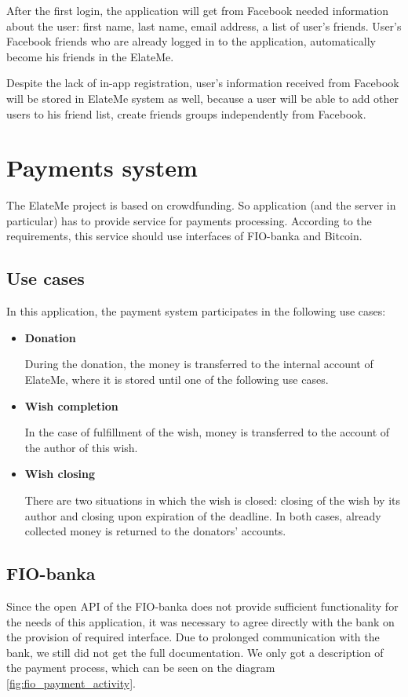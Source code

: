 After the first login, the application will get from Facebook needed information about the user: first name, last name, email address, a list of user's friends. User's Facebook friends who are already logged in to the application, automatically become his friends in the ElateMe.

Despite the lack of in-app registration, user's information received from Facebook will be stored in ElateMe system as well, because a user will be able to add other users to his friend list, create friends groups independently from Facebook.



\newcommand{\uitem}[1]{
\item \textbf{#1} \par
}
\newcommand{\aitem}[1]{
\item \textbf{#1} \par
}
\section{Payments system}
The ElateMe project is based on crowdfunding. So application (and the server in particular) has to provide service for payments processing. According to the requirements, this service should use interfaces of FIO-banka and Bitcoin.

\subsection{Use cases}
In this application, the payment system participates in the following use cases:

\begin{itemize}
\uitem{Donation}
During the donation, the money is transferred to the internal account of ElateMe, where it is stored until one of the following use cases.

\uitem{Wish completion}
In the case of fulfillment of the wish, money is transferred to the account of the author of this wish.

\uitem{Wish closing}
There are two situations in which the wish is closed: closing of the wish by its author and closing upon expiration of the deadline. In both cases, already collected money is returned to the donators' accounts.
\end{itemize}

\subsection{FIO-banka}
Since the open \ac{API} of the FIO-banka \cite{fio} does not provide sufficient functionality for the needs of this application, it was necessary to agree directly with the bank on the provision of required interface. Due to prolonged communication with the bank, we still did not get the full documentation. We only got a description of the payment process, which can be seen on the diagram \ref{fig:fio_payment_activity}.

